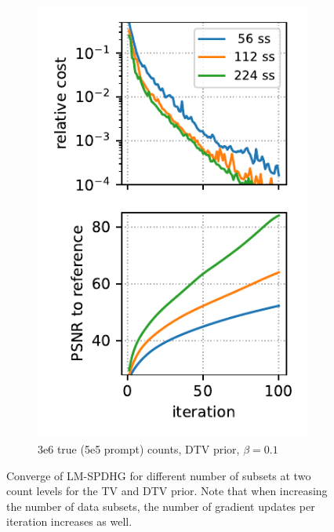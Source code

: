 \begin{figure}
\begin{subfigure}[b]{0.23\textwidth}
    \includegraphics[width=1.0\textwidth]{./figs/brain2d_counts_3.0E+06_seed_1_beta_1.0E-01_prior_DTV_niter_ref_20000_fwhm_4.5_4.5_niter_100_ss.pdf}
    \caption{3e6 true (5e5 prompt) counts, DTV prior, $\beta = 0.1$}
  \end{subfigure}

  \caption{Converge of LM-SPDHG for different number of subsets at two count levels for the TV and 
           DTV prior. Note that when increasing the number of data subsets, the number of gradient
           updates per iteration increases as well.}
  \label{fig:num_subsets}
\end{figure}

